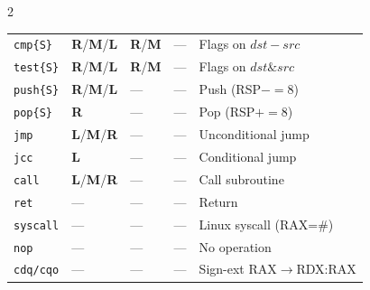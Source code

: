 \documentclass[landscape,a4paper]{article}
\newcommand{\Lc}{\textcolor{tL}{\textbf{L}}}
\newcommand{\Mc}{\textcolor{tM}{\textbf{M}}}
\newcommand{\Rc}{\textcolor{tR}{\textbf{R}}}
\begin{document}
\begin{tcolorbox}[mysec,
  title={Part 1: Instruction Set --- AT\&T: \texttt{op src, dst}
         \quad$|$\quad Intel: \texttt{op dst, src}}]
\begin{multicols}{2}
{\begin{tabular}{@{}l l l l p{2.5cm}@{}}
\midrule
\texttt{cmp\{S\}}  & \Rc/\Mc/\Lc & \Rc/\Mc & --- & Flags on $dst - src$ \\
\texttt{test\{S\}} & \Rc/\Mc/\Lc & \Rc/\Mc & --- & Flags on $dst\mathbin{\&}src$ \\
\midrule
\texttt{push\{S\}} & \Rc/\Mc/\Lc & --- & --- & Push (RSP$-=$8) \\
\texttt{pop\{S\}}  & \Rc         & --- & --- & Pop (RSP$+=$8) \\
\midrule
\texttt{jmp}       & \Lc/\Mc/\Rc & --- & --- & Unconditional jump \\
\texttt{jcc}       & \Lc         & --- & --- & Conditional jump \\
\texttt{call}      & \Lc/\Mc/\Rc & --- & --- & Call subroutine \\
\texttt{ret}       & ---         & --- & --- & Return \\
\midrule
\texttt{syscall}   & --- & --- & --- & Linux syscall (RAX=\#) \\
\texttt{nop}       & --- & --- & --- & No operation \\
\texttt{cdq/cqo}   & --- & --- & --- & Sign-ext RAX$\to$RDX:RAX \\
\bottomrule
\end{tabular}
}

\columnbreak


\end{multicols}
\end{tcolorbox}
\end{document}
